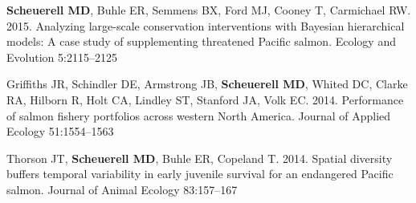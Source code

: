 \documentclass[
]{article}
\begin{document}
\textbf{Scheuerell MD}, Buhle ER, Semmens BX, Ford MJ, Cooney T,
Carmichael RW. 2015. Analyzing large-scale conservation interventions
with Bayesian hierarchical models: A case study of supplementing
threatened Pacific salmon. Ecology and Evolution 5:2115--2125

Griffiths JR, Schindler DE, Armstrong JB, \textbf{Scheuerell MD}, Whited
DC, Clarke RA, Hilborn R, Holt CA, Lindley ST, Stanford JA, Volk EC.
2014. Performance of salmon fishery portfolios across western North
America. Journal of Applied Ecology 51:1554--1563

Thorson JT, \textbf{Scheuerell MD}, Buhle ER, Copeland T. 2014. Spatial
diversity buffers temporal variability in early juvenile survival for an
endangered Pacific salmon. Journal of Animal Ecology 83:157--167

\setlength{\parindent}{0in}
\setlength{\leftskip}{0in}
\setlength{\parskip}{0pt}
\end{document}

